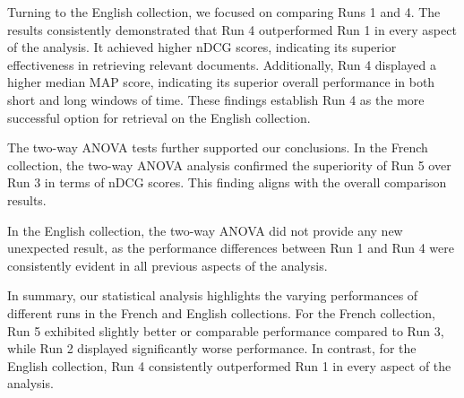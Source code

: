 Turning to the English collection, we focused on comparing Runs 1 and 4. 
The results consistently demonstrated that Run 4 outperformed Run 1 in every aspect of the analysis. 
It achieved higher \ac{nDCG} scores, indicating its superior effectiveness in retrieving relevant documents. 
Additionally, Run 4 displayed a higher median \ac{MAP} score, indicating its superior overall performance in both short and long windows of time. 
These findings establish Run 4 as the more successful option for retrieval on the English collection.

The two-way \ac{ANOVA} tests further supported our conclusions. 
In the French collection, the two-way \ac{ANOVA} analysis confirmed the superiority of Run 5 over Run 3 in terms of \ac{nDCG} scores. 
This finding aligns with the overall comparison results. 

In the English collection, the two-way \ac{ANOVA} did not provide any new unexpected result, as the performance differences between Run 1 and Run 4 were consistently evident in all previous aspects of the analysis.

In summary, our statistical analysis highlights the varying performances of different runs in the French and English collections. 
For the French collection, Run 5 exhibited slightly better or comparable performance compared to Run 3, while Run 2 displayed significantly worse performance. 
In contrast, for the English collection, Run 4 consistently outperformed Run 1 in every aspect of the analysis.

































